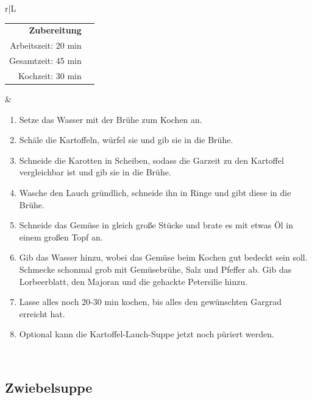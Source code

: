\documentclass[a4paper, 12pt]{scrbook} 								%
\numberwithin{equation}{section} 									%
\begin{document}
\begin{tabularx}{\textwidth}{r|L}
\begin{tabular}[t]{rr}
				\textbf{Zubereitung}	\\
				Arbeitszeit: 20 min	\\
				Gesamtzeit:	45 min		\\
				Kochzeit: 30 min	\\
			\end{tabular}			&	\begin{enumerate}[]
											\item Setze das Wasser mit der Brühe zum Kochen an.
											\item Schäle die Kartoffeln, würfel sie und gib sie in die Brühe.
											\item Schneide die Karotten in Scheiben, sodass die Garzeit zu den Kartoffel vergleichbar ist und gib sie in die Brühe.
											\item Wasche den Lauch gründlich, schneide ihn in Ringe und gibt diese in die Brühe.
											
											\item Schneide das Gemüse in gleich große Stücke und brate es mit etwas Öl in einem großen Topf an.
											\item Gib das Wasser hinzu, wobei das Gemüse beim Kochen gut bedeckt sein soll. Schmecke schonmal grob mit Gemüsebrühe, Salz und Pfeffer ab. Gib das Lorbeerblatt, den Majoran und die gehackte Petersilie hinzu. 

											\item Lasse alles noch 20-30 min kochen, bis alles den gewünschten Gargrad erreicht hat.
											\item Optional kann die Kartoffel-Lauch-Suppe jetzt noch püriert werden.
										\end{enumerate}	\\
		\end{tabularx}
		\newpage


		\subsection{Zwiebelsuppe}	\label{zwiebelsuppe}
\end{document}
